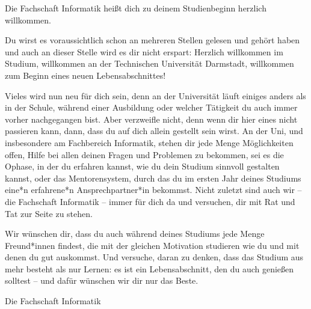 {Die Fachschaft Informatik heißt dich zu deinem Studienbeginn herzlich willkommen.}{
    Du wirst es voraussichtlich schon an mehreren Stellen gelesen und gehört haben und auch an dieser Stelle wird es dir nicht erspart: Herzlich willkommen im Studium, willkommen an der Technischen Universität Darmstadt, willkommen zum Beginn eines neuen Lebensabschnittes!

    Vieles wird nun neu für dich sein, denn an der Universität läuft einiges anders als in der Schule, während einer Ausbildung oder welcher Tätigkeit du auch immer vorher nachgegangen bist. Aber verzweifle nicht, denn wenn dir hier eines nicht passieren kann, dann, dass du auf dich allein gestellt sein wirst. An der Uni, und insbesondere am Fachbereich Informatik, stehen dir jede Menge Möglichkeiten offen, Hilfe bei allen deinen Fragen und Problemen zu bekommen, sei es die Ophase, in der du erfahren kannst, wie du dein Studium sinnvoll gestalten kannst, oder das Mentorensystem, durch das du im ersten Jahr deines Studiums eine*n erfahrene*n Ansprechpartner*in bekommst. Nicht zuletzt sind auch wir – die Fachschaft Informatik – immer für dich da und versuchen, dir mit Rat und Tat zur Seite zu stehen.

    Wir wünschen dir, dass du auch während deines Studiums jede Menge Freund*innen findest, die mit der gleichen Motivation studieren wie du und mit denen du gut auskommst. Und versuche, daran zu denken, dass das Studium aus mehr besteht als nur Lernen: es ist ein Lebensabschnitt, den du auch genießen solltest – und dafür wünschen wir dir nur das Beste.
}
{Die Fachschaft Informatik}

\vfill

\noindent
{}

\newpage
